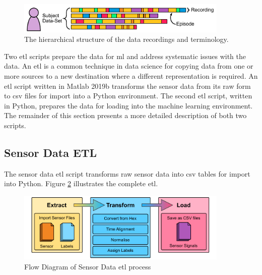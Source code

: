 \begin{figure}[!htb]
    \centering
    \includegraphics[width=0.9\textwidth]{content/3-Methods/Data_Terminology.pdf}
    \caption{The hierarchical structure of the data recordings and terminology.}
    \label{fig:methods-data-hierachy}
\end{figure}

Two \acrfull{etl} scripts prepare the data for \acrshort{ml} and address systematic issues with the data. An \acrshort{etl} is a common technique in data science for copying data from one or more sources to a new destination where a different representation is required. An \acrshort{etl} script written in Matlab 2019b transforms the sensor data from its raw form to \acrshort{csv} files for import into a Python environment. The second \acrshort{etl} script, written in Python, prepares the data for loading into the machine learning environment. The remainder of this section presents a more detailed description of both two scripts.

\subsection{Sensor Data ETL}
\label{subsec:sensor-ETL}
The sensor data \acrshort{etl} script transforms raw sensor data into \acrshort{csv} tables for import into Python. Figure \ref{fig:methods_sensor_ETL} illustrates the complete \acrshort{etl}.

\begin{figure}[!htb]
    \centering
    \includegraphics[width=0.9\textwidth]{content/3-Methods/Sensor_ETL.pdf}
    \caption{Flow Diagram of Sensor Data \acrshort{etl} process}
    \label{fig:methods_sensor_ETL}
\end{figure}

